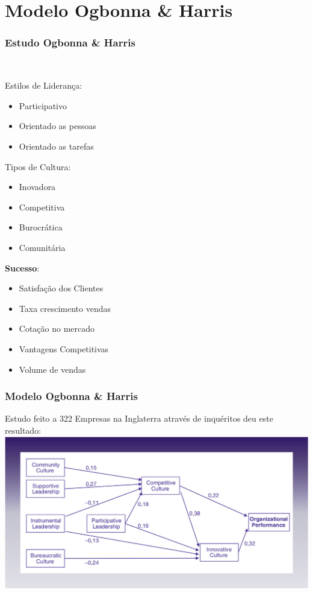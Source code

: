 \section{Modelo Ogbonna \& Harris}
\begin{frame}
\frametitle{Estudo Ogbonna \& Harris}
 \\
\vspace{.7cm}
\begin{minipage}[t]{.3\linewidth}
\quad Estilos de Liderança:
\begin{itemize}
\setlength\itemsep{-0.3em}
\item Participativo
\item Orientado as pessoas
\item Orientado as tarefas
\end{itemize}
\end{minipage}
\begin{minipage}[t]{.3\linewidth}
\quad Tipos de Cultura:
\begin{itemize}
\setlength\itemsep{-0.3em}
\item Inovadora
\item Competitiva
\item Burocrática
\item Comunitária
\end{itemize}
\end{minipage}
\begin{minipage}[t]{.3\linewidth}
\quad \textbf{Sucesso}:
\begin{itemize}
\setlength\itemsep{-0.3em}
\item Satisfação dos Clientes
\item Taxa crescimento vendas
\item Cotação no mercado
\item Vantagens Competitivas
\item Volume de vendas
\end{itemize}
\end{minipage}
\end{frame}
\begin{frame}
\frametitle{Modelo Ogbonna \& Harris}
Estudo feito a 322 Empresas na Inglaterra através de inquéritos deu este resultado:\\
\vspace{.2cm}
\includegraphics[scale=.25]{"./image/OB/Ogbonna & Harris.jpg"}
\end{frame}
